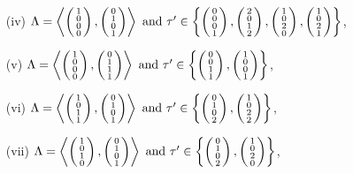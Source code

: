 \begin{prop}
\begin{itemize}
\item[(iv)] 
$\Lambda=\plan{1\\0\\0\\0}{0\\1\\0\\1} \text{ and } \tau' \in \left\{ \vect{0\\0\\0\\1},\vect{2\\0\\1\\2},\vect{1\\0\\2\\0},\vect{1\\0\\2\\1} \right\}$,
\item[(v)]
$\Lambda=\plan{1\\0\\0\\0}{0\\1\\1\\1} \text{ and } \tau' \in \left\{ \vect{0\\0\\1\\1},\vect{1\\0\\0\\1} \right\}$,

\item[(vi)] 
$\Lambda=\plan{1\\0\\1\\1}{0\\1\\0\\1} \text{ and } \tau' \in \left\{ \vect{0\\1\\0\\2},\vect{1\\0\\2\\2} \right\}$,

\item[(vii)]
$\Lambda=\plan{1\\0\\1\\0}{0\\1\\0\\1} \text{ and } \tau' \in \left\{ \vect{0\\1\\0\\2},\vect{1\\0\\2\\0} \right\}$,


\end{itemize}
\end{prop}
